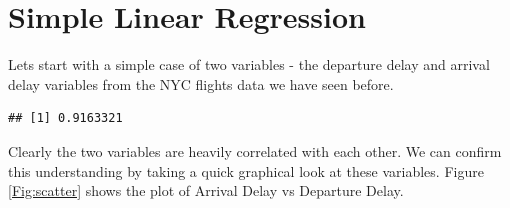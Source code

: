 \documentclass[11pt, letterpaper, twoside]{memoir}\usepackage{knitr}
\begin{document}
\section{Simple Linear Regression}

Lets start with a simple case of two variables - the departure delay and arrival delay variables from the NYC flights data we have seen before.

\begin{knitrout}
\color{fgcolor}\begin{kframe}
\begin{alltt}
 \hlkwb{<-} \hlstd{(}\hlstd{)}
\end{alltt}
\end{kframe}
\end{knitrout}

\begin{knitrout}
\color{fgcolor}\begin{kframe}
\begin{alltt}
\end{alltt}
\end{kframe}
\end{knitrout}

\begin{knitrout}
\color{fgcolor}\begin{kframe}
\begin{alltt}
  \hlstd{=} \hlstd{)}
\end{alltt}
\begin{verbatim}
## [1] 0.9163321
\end{verbatim}
\end{kframe}
\end{knitrout}

  Clearly the two variables are heavily correlated with each other. We can confirm this understanding by taking a quick graphical look at these variables. Figure \ref{Fig:scatter}  shows the plot of Arrival Delay vs Departure Delay. 
\end{document}
